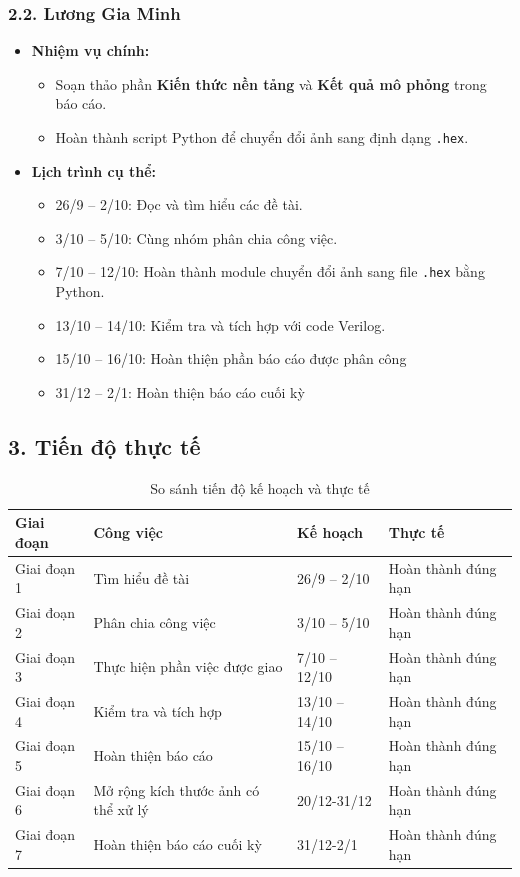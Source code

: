 \subsubsection*{2.2. Lương Gia Minh}
\begin{itemize}
    \item \textbf{Nhiệm vụ chính:}
    \begin{itemize}
        \item Soạn thảo phần \textbf{Kiến thức nền tảng} và \textbf{Kết quả mô phỏng} trong báo cáo.
        \item Hoàn thành script Python để chuyển đổi ảnh sang định dạng \texttt{.hex}.
    \end{itemize}
    \item \textbf{Lịch trình cụ thể:}
    \begin{itemize}
        \item 26/9 -- 2/10: Đọc và tìm hiểu các đề tài.
        \item 3/10 -- 5/10: Cùng nhóm phân chia công việc.
        \item 7/10 -- 12/10: Hoàn thành module chuyển đổi ảnh sang file \texttt{.hex} bằng Python.
        \item 13/10 -- 14/10: Kiểm tra và tích hợp với code Verilog.
        \item 15/10 -- 16/10: Hoàn thiện phần báo cáo được phân công
        \item 31/12 -- 2/1: Hoàn thiện báo cáo cuối kỳ
    \end{itemize}
\end{itemize}

\subsection*{3. Tiến độ thực tế}

\begin{table}[h]
\centering
\renewcommand{\arraystretch}{1.2}
\setlength{\tabcolsep}{6pt}
\begin{tabular}{|p{2.5cm}|p{5.5cm}|p{3cm}|p{3cm}|}
\hline
\textbf{Giai đoạn} & \textbf{Công việc} & \textbf{Kế hoạch} & \textbf{Thực tế} \\
\hline
Giai đoạn 1 & Tìm hiểu đề tài & 26/9 -- 2/10 & Hoàn thành đúng hạn \\
\hline
Giai đoạn 2 & Phân chia công việc & 3/10 -- 5/10 & Hoàn thành đúng hạn \\
\hline
Giai đoạn 3 & Thực hiện phần việc được giao & 7/10 -- 12/10 & Hoàn thành đúng hạn \\
\hline
Giai đoạn 4 & Kiểm tra và tích hợp & 13/10 -- 14/10 & Hoàn thành đúng hạn \\
\hline
Giai đoạn 5 & Hoàn thiện báo cáo & 15/10 -- 16/10 & Hoàn thành đúng hạn \\
 Giai đoạn 6& Mở rộng kích thước ảnh có thể xử lý& 20/12-31/12&Hoàn thành đúng hạn\\\hline
\hline
 Giai đoạn 7& Hoàn thiện báo cáo cuối kỳ& 31/12-2/1&Hoàn thành đúng hạn\\\hline
\end{tabular}
\caption{So sánh tiến độ kế hoạch và thực tế}
\end{table}